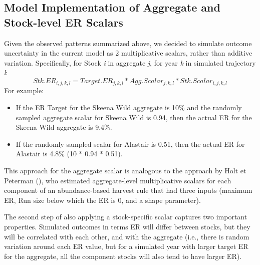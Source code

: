 \documentclass[french,11pt]{book}
\begin{document}
\endgroup{} \endgroup{}

\clearpage

\subsection{Model Implementation of Aggregate and Stock-level ER Scalars}\label{model-implementation-of-aggregate-and-stock-level-er-scalars}

Given the observed patterns summarized above, we decided to simulate outcome uncertainty in the current model as 2 multiplicative scalars, rather than additive variation. Specifically, for Stock \emph{i} in aggregate \emph{j}, for year \emph{k} in simulated trajectory \emph{l}:
\begin{equation} 
    Stk.ER_{i,j,k,l} = Target.ER_{j,k,l} * Agg.Scalar_{j,k,l} * Stk.Scalar_{i,j,k,l}
\end{equation}
For example:
\begin{itemize}

\item
  If the ER Target for the Skeena Wild aggregate is 10\% and the randomly sampled aggregate scalar for Skeena Wild is 0.94, then the actual ER for the Skeena Wild aggregate is 9.4\%.
\item
  If the randomly sampled scalar for Alastair is 0.51, then the actual ER for Alastair is 4.8\% (10 * 0.94 * 0.51).
\end{itemize}
This approach for the aggregate scalar is analogous to the approach by Holt et Peterman (), who estimated aggregate-level multiplicative scalars for each component of an abundance-based harvest rule that had three inputs (maximum ER, Run size below which the ER is 0, and a shape parameter).

The second step of also applying a stock-specific scalar captures two important properties. Simulated outcomes in terms ER will differ between stocks, but they will be correlated with each other, and with the aggregate (i.e., there is random variation around each ER value, but for a simulated year with larger target ER for the aggregate, all the component stocks will also tend to have larger ER).
\end{document}
